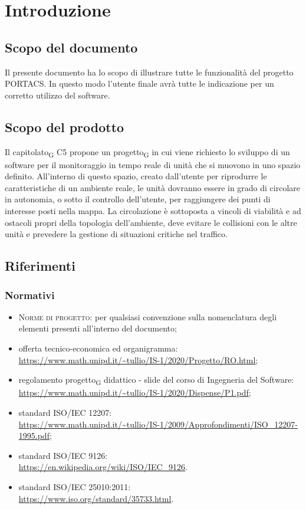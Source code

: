 \section{Introduzione}
\subsection{Scopo del documento}
    Il presente documento ha lo scopo di illustrare tutte le funzionalità del progetto PORTACS. In questo modo l'utente finale avrà tutte le indicazione per un corretto utilizzo del software.


\subsection{Scopo del prodotto}

    Il capitolato\textsubscript{G} C5 propone un progetto\textsubscript{G} in cui viene richiesto lo sviluppo di un software per il monitoraggio in tempo reale di unità che si muovono in uno spazio definito. All'interno di questo spazio, creato dall'utente per riprodurre le caratteristiche di un ambiente reale, le unità dovranno essere in grado di circolare in autonomia, o sotto il controllo dell'utente, per raggiungere dei punti di interesse posti nella mappa.  La circolazione è sottoposta a vincoli di viabilità e ad ostacoli propri della topologia dell'ambiente, deve evitare le collisioni con le altre unità e prevedere la gestione di situazioni critiche nel traffico.

\subsection{Riferimenti}
\label{ref}
    \subsubsection{Normativi}
    \begin{itemize}
    	\item \textsc{Norme di progetto}: per qualsiasi convenzione sulla nomenclatura degli elementi presenti all'interno del documento;
    	\item offerta tecnico-economica ed organigramma: \newline  \url{https://www.math.unipd.it/~tullio/IS-1/2020/Progetto/RO.html};
    	\item regolamento progetto\textsubscript{G} didattico - slide del corso di Ingegneria del Software: \newline \url{https://www.math.unipd.it/~tullio/IS-1/2020/Dispense/P1.pdf};
        \item standard ISO/IEC 12207:\\ \url{https://www.math.unipd.it/~tullio/IS-1/2009/Approfondimenti/ISO_12207-1995.pdf};
        \item standard ISO/IEC 9126:\\
        \url{https://en.wikipedia.org/wiki/ISO/IEC_9126}.
        \item standard ISO/IEC 25010:2011:\\
        \url{https://www.iso.org/standard/35733.html}.
    \end{itemize}

